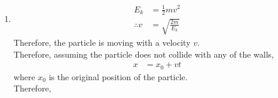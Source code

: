 \documentclass[fleqn, a4paper, 11pt, oneside]{amsart}
\theoremstyle{definition}
\theoremstyle{theorem}
\begin{document}
\begin{solution}
	\begin{enumerate}[leftmargin=*]
		\item
			\begin{align*}
				E_k          & = \frac{1}{2} m v^2 \\
				\therefore v & = \sqrt{\frac{2 m}{E_k}}
			\end{align*}
			Therefore, the particle is moving with a velocity $v$.\\
			Therefore, assuming the particle does not collide with any of the walls,
			\begin{align*}
				x & = x_0 + v t
			\end{align*}
			where $x_0$ is the original position of the particle.\\
			Therefore,
			\begin{figure}[H]
				\centering
\end{figure}
\end{enumerate}
\end{solution}
\end{document}
